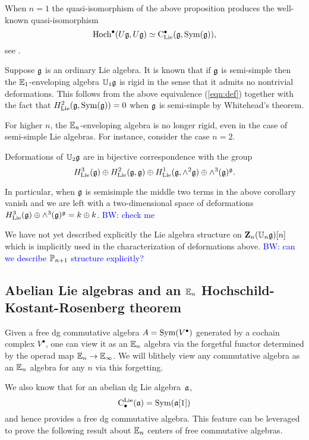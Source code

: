 \documentclass[11pt]{amsart}
\numberwithin{equation}{section}
\def\brian{\textcolor{blue}{BW: }\textcolor{blue}}
\begin{document}
\begin{rmk}
When $n=1$ the quasi-isomorphism of the above proposition produces the well-known quasi-isomorphism
\[
{\rm Hoch}^\bullet(U \mathfrak g , U \mathfrak g) \simeq {\rm C}_{{\rm Lie}}^\bullet(\mathfrak g , {\rm Sym}(\mathfrak g)) ,
\]
see \cite{LodayCyclicBook}. 
\end{rmk}

Suppose $\mathfrak g$ is an ordinary Lie algebra.
It is known that if $\mathfrak g$ is semi-simple then the $\mathbb E_1$-enveloping algebra $\mathbb U_1 \mathfrak g$ is rigid in the sense that it admits no nontrivial deformations. 
This follows from the above equivalence (\ref{eqn:def}) together with the fact that $H_{\rm Lie}^2(\mathfrak g , {\rm Sym}(\mathfrak g)) = 0$ when $\mathfrak g$ is semi-simple by Whitehead's theorem. 

For higher $n$, the $\mathbb E_n$-enveloping algebra is no longer rigid, even in the case of semi-simple Lie algebras. 
For instance, consider the case $n=2$.
\begin{cor}
Deformations of $\mathbb U_2 \mathfrak g$ are in bijective correspondence with the group
\[
H^3_{\rm Lie}(\mathfrak g) \oplus H^2_{\rm Lie}(\mathfrak g , \mathfrak g) \oplus H^1_{\rm Lie}(\mathfrak g , \wedge^2 \mathfrak g) \oplus \wedge^3(\mathfrak g)^\mathfrak g .
\]
\end{cor}

In particular, when $\mathfrak g$ is semisimple the middle two terms in the above corollary vanish and we are left with a two-dimensional space of deformations $H^3_{\rm Lie}(\mathfrak g) \oplus \wedge^3 (\mathfrak g)^\mathfrak g = k \oplus k$. \brian{check me}

We have not yet described explicitly the Lie algebra structure on $\mathbf Z_n(\mathbb U_n \mathfrak g)[n]$ which is implicitly used in the characterization of deformations above. 
\brian{can we describe $\mathbb P_{n+1}$ structure explicitly?}

\subsection{Abelian Lie algebras and an $\mathbb E_n$ Hochschild-Kostant-Rosenberg theorem}

Given a free dg commutative algebra $A = {\rm Sym}(V^\bullet)$ generated by a cochain complex $V^\bullet$,
one can view it as an $\mathbb E_n$ algebra via the forgetful functor determined by the operad map $\mathbb E_n \to \mathbb E_\infty$.
We will blithely view any commutative algebra as an $\mathbb E_n$ algebra for any $n$ via this forgetting.

We also know that for an abelian dg Lie algebra~${\frak a}$, 
\[
{\rm C}^{\rm Lie}_\bullet({\frak a}) = {\rm Sym}({\frak a}[1])
\]
and hence provides a free dg commutative algebra.
This feature can be leveraged to prove the following result about $\mathbb E_n$ centers of free commutative algebras.
\end{document}

